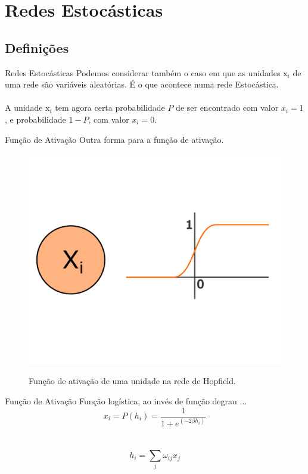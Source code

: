 \section{Redes Estocásticas}

\subsection{Definições}
\begin{frame}{Redes Estocásticas}%
  \justifying%
  Podemos considerar também o caso em que as unidades $\mathrm{x}_{i}$ de uma rede são variáveis aleatórias. É o que acontece numa rede Estocástica.
  \\~\\
  A unidade $\mathrm{x}_{i}$ tem agora certa probabilidade $P$ de ser encontrado com valor $x_{i} = 1$, e probabilidade $1 - P$, com valor $x_{i} = 0$.
\end{frame}

\begin{frame}{Função de Ativação}%
  \justifying%
  Outra forma para a função de ativação.
  \begin{figure}[h]{}%
    \label{fig:stoc-activation}%
    \includegraphics[scale=0.35]{images/stochastic_activation.png}
    \caption{Função de ativação de uma unidade na rede de Hopfield.}
  \end{figure}
\end{frame}

\begin{frame}{Função de Ativação}%
  \justifying%
  Função logística, ao invés de função degrau $\dots$
  \begin{equation}%
    \label{eq:stoc-prob}
    x_{i} = P(h_{i}) = \frac{1}{1 + e^{(-2\beta h_{i})}}
  \end{equation}
  \\~\\
  \begin{equation}%
    \label{eq:hi}%
    h_{i} = \sum_{j} \omega_{ij} x_{j}
  \end{equation}
\end{frame}

